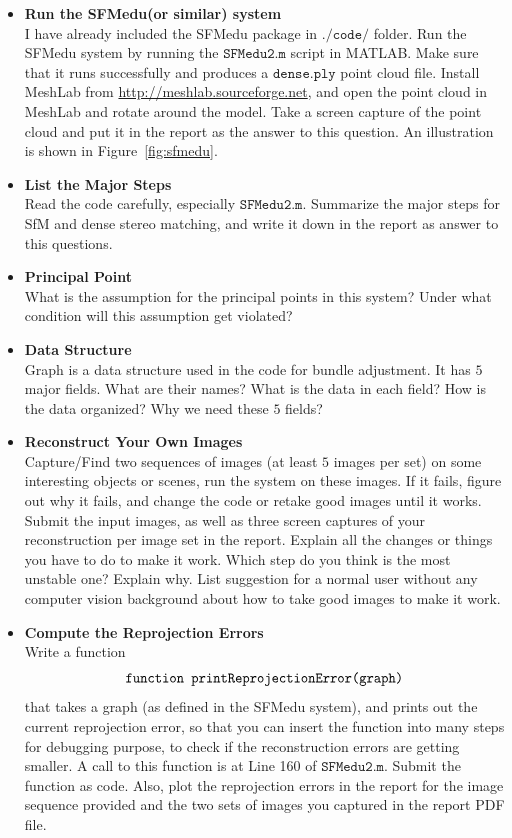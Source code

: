 \documentclass[11pt]{article}
\begin{document}
\begin{itemize}
\item{{\bf{Run the SFMedu(or similar) system}}\\
I have already included the SFMedu package in $\texttt{./code/}$ folder. Run the SFMedu system by running the $\texttt{SFMedu2.m}$ script in MATLAB. Make sure that it runs successfully and produces a $\texttt{dense.ply}$ point cloud file. Install MeshLab from \url{http://meshlab.sourceforge.net}, and open the point cloud in MeshLab and rotate around the model. Take a screen capture of the point cloud and put it in the report as the answer to this question. An illustration is shown in Figure~\ref{fig:sfmedu}.}

\item{{\bf{List the Major Steps}}\\
Read the code carefully, especially $\texttt{SFMedu2.m}$. Summarize the major steps for SfM and dense stereo matching, and write it down in the report as answer to this questions.}

\item{{\bf{Principal Point}}\\
What is the assumption for the principal points in this system? Under what condition will this assumption get violated?}

\item{{\bf{Data Structure}}\\
Graph is a data structure used in the code for bundle adjustment. It has $5$ major fields. What are their names? What is the data in each field? How is the data organized? Why we need these $5$ fields?}

\item{{\bf{Reconstruct Your Own Images}}\\
Capture/Find two sequences of images (at least $5$ images per set) on some interesting objects or scenes, run the system on these images. If it fails, figure out why it fails, and change the code or retake good images until it works. Submit the input images, as well as three screen captures of your reconstruction per image set in the report. Explain all the changes or things you have to do to make it work. Which step do you think is the most unstable one? Explain why. List suggestion for a normal user without any computer vision background about how to take good images to make it work.}

\item{{\bf{Compute the Reprojection Errors}}\\
Write a function\vspace{-0.05in}
$$\texttt{function printReprojectionError(graph)}\vspace{-0.05in}$$
that takes a graph (as defined in the SFMedu system), and prints out the current reprojection error, so that you can insert the function into many steps for debugging purpose, to check if the reconstruction errors are getting smaller. A call to this function is at Line 160 of $\texttt{SFMedu2.m}$. Submit the function as code. Also, plot the reprojection errors in the report for the image sequence provided and the two sets of images you captured in the report PDF file.}


\end{itemize}
\end{document}

